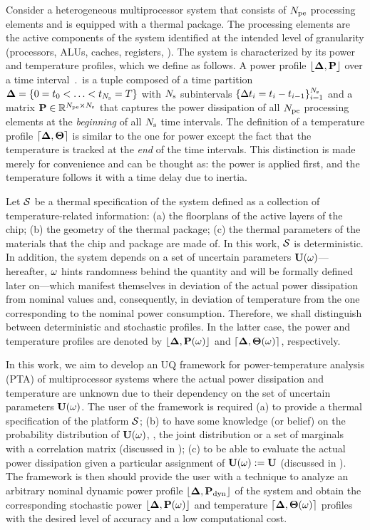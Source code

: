 Consider a heterogeneous multiprocessor system that consists of ${N_\text{pe}}$ processing elements and is equipped with a thermal package. The processing elements are the active components of the system identified at the intended level of granularity (processors, ALUs, caches, registers, \etc). The system is characterized by its power and temperature profiles, which we define as follows. A power profile $\profP$ over a time interval $\period$ is a tuple composed of a time partition $\boldsymbol{\Delta} = \{ 0 = t_0 < \dotsc < t_{N_\text{s}} = T \}$ with $N_\text{s}$ subintervals $\{ \Delta t_i = t_i - t_{i - 1} \}_{i = 1}^{N_\text{s}}$ and a matrix $\mP \in \real^{\cores \times \steps}$ that captures the power dissipation of all ${N_\text{pe}}$ processing elements at the \emph{beginning} of all $N_\text{s}$ time intervals. The definition of a temperature profile $\profT$ is similar to the one for power except the fact that the temperature is tracked at the \emph{end} of the time intervals. This distinction is made merely for convenience and can be thought as: the power is applied first, and the temperature follows it with a time delay due to inertia.

Let $\mathcal{S}$ be a thermal specification of the system defined as a collection of temperature-related information: (a) the floorplans of the active layers of the chip; (b) the geometry of the thermal package; (c) the thermal parameters of the materials that the chip and package are made of. In this work, $\mathcal{S}$ is deterministic. In addition, the system depends on a set of uncertain parameters $\mathbf{U}(\omega)$---hereafter, $\omega$ hints randomness behind the quantity and will be formally defined later on---which manifest themselves in deviation of the actual power dissipation from nominal values and, consequently, in deviation of temperature from the one corresponding to the nominal power consumption. Therefore, we shall distinguish between deterministic and stochastic profiles. In the latter case, the power and temperature profiles are denoted by $\profP{\o}$ and $\profT{\o}$, respectively.

In this work, we aim to develop an UQ framework for power-temperature analysis (PTA) of multiprocessor systems where the actual power dissipation and temperature are unknown due to their dependency on the set of uncertain parameters $\mathbf{U}(\omega)$. The user of the framework is required (a) to provide a thermal specification of the platform $\mathcal{S}$; (b) to have some knowledge (or belief) on the probability distribution of $\mathbf{U}(\omega)$, \eg, the joint distribution or a set of marginals with a correlation matrix (discussed in ); (c) to be able to evaluate the actual power dissipation given a particular assignment of $\mathbf{U}(\omega) := \mathbf{U}$ (discussed in ). The framework is then should provide the user with a technique to analyze an arbitrary nominal dynamic power profile $\profPdyn$ of the system and obtain the corresponding stochastic power $\profP{\o}$ and temperature $\profT{\o}$ profiles with the desired level of accuracy and a low computational cost.

